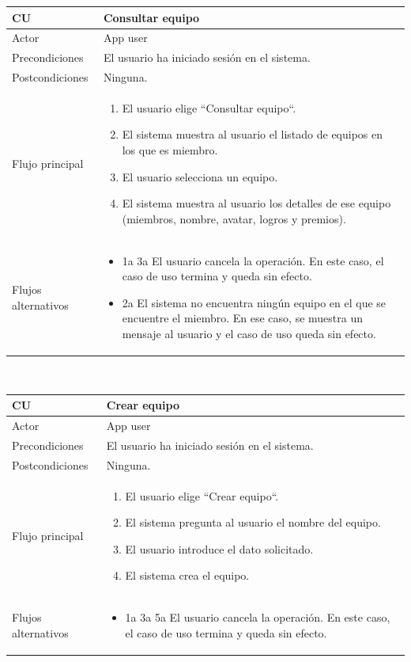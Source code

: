 \documentclass[twoside]{report}
\newcommand\addrow[2]{#1 &#2\\ }
\newcommand\addheading[2]{#1 &#2\\ \hline}
\newcommand\tabularhead{\begin{tabular}{lp{0.7\textwidth}}
\hline
}
\newenvironment{usecase}{\tabularhead}
{\hline\end{tabular}}
\begin{document}
\vspace{0.5cm}

\begin{usecase}
  \addheading{\textbf{CU\arabic{usecase}}}{Consultar equipo} 
  \addrow{Actor}{App user}
  \addrow{Precondiciones}{El usuario ha iniciado sesión en el sistema.}
  \addrow{Postcondiciones}{Ninguna.}
  \addrow{Flujo principal}{
  		\begin{enumerate}
  		\item El usuario elige “Consultar equipo“. %
  		\item El sistema muestra al usuario el listado de equipos en los que es miembro. %
  		\item El usuario selecciona un equipo. %
  		\item El sistema muestra al usuario los detalles de ese equipo (miembros, nombre, avatar, logros y premios). %
  		\end{enumerate}
  }
  \addrow{Flujos alternativos}{
  		\begin{itemize}
  		\item 1a 3a El usuario cancela la operación. En este caso, el caso de uso termina y queda sin efecto.
  		\item 2a El sistema no encuentra ningún equipo en el que se encuentre el miembro. En ese caso, se muestra un mensaje al usuario y el caso de uso queda sin efecto.
  		\end{itemize}
  }
\end{usecase}\\

\vspace{0.5cm}

\begin{usecase}
  \addheading{\textbf{CU\arabic{usecase}}}{Crear equipo} 
  \addrow{Actor}{App user}
  \addrow{Precondiciones}{El usuario ha iniciado sesión en el sistema.}
  \addrow{Postcondiciones}{Ninguna.}
  \addrow{Flujo principal}{
  		\begin{enumerate}
  		\item El usuario elige “Crear equipo“. %
  		\item El sistema pregunta al usuario el nombre del equipo. %
  		\item El usuario introduce el dato solicitado. %
  		\item El sistema  crea el equipo. %
  		\end{enumerate}
  }
  \addrow{Flujos alternativos}{
  		\begin{itemize}
  		\item 1a 3a 5a El usuario cancela la operación. En este caso, el caso de uso termina y queda sin efecto.
  		\end{itemize}
  }
\end{usecase}\\
\end{document}

